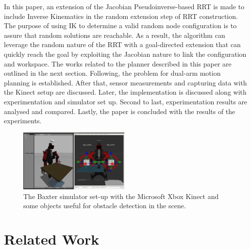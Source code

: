 \documentclass[conference]{IEEEtran} \usepackage[T1]{fontenc} \usepackage[backend=biber, style=ieee]{biblatex}
\begin{document}
In this paper, an extension of the Jacobian Pseudoinverse-based RRT is made to include Inverse Kinematics in the random extension step of RRT construction.
The purpose of using IK to determine a valid random node configuration is to assure that random solutions are reachable. As a result, the algorithm can leverage the random 
nature of the RRT with a goal-directed extension that can quickly reach the goal by exploiting the Jacobian nature to link the configuration and workspace.
The works related to the planner described in this paper are outlined in the next section. Following, the problem for dual-arm motion planning is established. 
After that, sensor measurements and capturing data with the Kinect setup are discussed. Later, the implementation is discussed along with experimentation and 
simulator set up. Second to last, experimentation results are analysed and compared. Lastly, the paper is concluded with the results of the experiments.

\begin{figure}
\label{pic1} 
\centering 
\includegraphics[width=0.49\textwidth]{sim1}
\caption{The Baxter simulator set-up with the Microsoft Xbox Kinect and some objects useful for obstacle detection in the scene.}
\end{figure}

\section{Related Work} \label{Related Work}
\end{document}
